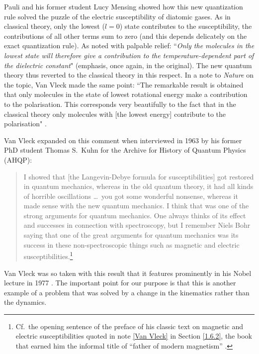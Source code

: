 Pauli and his former student Lucy Mensing showed how this new quantization rule solved the puzzle of the electric susceptibility of diatomic gases. As in classical theory, only the lowest ($l=0$) state contributes to the susceptibility, the contributions of all other terms sum to zero (and this depends delicately on the exact quantization rule). As \citet[p.\ 512]{Mensing and Pauli 1926} noted with palpable relief: ``{\it Only the molecules in the lowest state will therefore give a contribution to the temperature-dependent part of the dielectric constant}" (emphasis, once again, in the original). The new quantum theory thus reverted to the classical theory in this respect. In a note to \emph{Nature} on the topic, Van Vleck made the same point: ``The remarkable result is obtained that only molecules in the state of lowest rotational energy make a contribution to the polarisation. This corresponds very beautifully to the fact that in the classical theory only molecules with [the lowest energy] contribute to the polarisation" \citep[p.\ 227]{Van Vleck 1926}.

Van Vleck expanded on this comment when interviewed in 1963 by his former PhD student Thomas S.\ Kuhn for the Archive for History of Quantum Physics (AHQP):
\begin{quote}
I showed that [the Langevin-Debye formula for susceptibilities] got restored in quantum mechanics, whereas in the old quantum theory, it had all kinds of horrible oscillations \ldots\  you got some wonderful nonsense, whereas it made sense with the new quantum mechanics. I think that was one of the strong arguments for quantum mechanics. One always thinks of its effect and successes in connection with spectroscopy, but I remember Niels Bohr saying that one of the great arguments for quantum mechanics was its success in these non-spectroscopic things such as magnetic and electric susceptibilities.\footnote{Cf.\ the opening sentence of the preface of his classic text on magnetic and electric susceptibilities \citep{Van Vleck 1932} quoted in note \ref{Van Vleck} in Section \ref{1.6.2}, the book that earned him the informal title of ``father of modern magnetism'' \citep[p.\ 139]{Midwinter and Janssen 2013}.}
\end{quote}
Van Vleck was so taken with this result that it features prominently in his Nobel lecture in 1977 \citep[p.\ 138]{Midwinter and Janssen 2013}. The important point for our purpose is that this is another example of a problem that was solved by a change in the kinematics rather than the dynamics.

